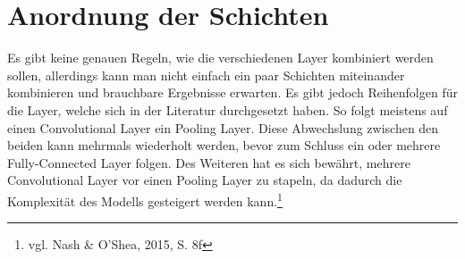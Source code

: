 \documentclass[a4paper,12pt,ngerman,oneside]{scrreprt}	%
\newcommand{\cnnKlein}[1]{vgl. Nash \& O'Shea, 2015, S. {#1}}
\begin{document}
		\section{Anordnung der Schichten}
		Es gibt keine genauen Regeln, wie die verschiedenen Layer kombiniert werden sollen, allerdings kann man nicht einfach ein paar Schichten miteinander kombinieren und brauchbare Ergebnisse erwarten. Es gibt jedoch Reihenfolgen für die Layer, welche sich in der Literatur durchgesetzt haben. So folgt meistens auf einen Convolutional Layer ein Pooling Layer. Diese Abwechslung zwischen den beiden kann mehrmals wiederholt werden, bevor zum Schluss ein oder mehrere Fully-Connected Layer folgen. Des Weiteren hat es sich bewährt, mehrere Convolutional Layer vor einen Pooling Layer zu stapeln, da dadurch die Komplexität des Modells gesteigert werden kann.\footnote{\cnnKlein{8f}}
	
\end{document}
